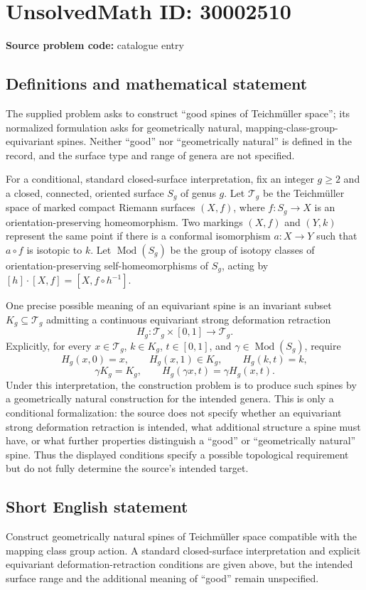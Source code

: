 \documentclass[11pt]{article}
\begin{document}
\section*{UnsolvedMath ID: 30002510}
\textbf{Source problem code:} catalogue entry
\subsection{Definitions and mathematical statement}
The supplied problem asks to construct ``good spines of Teichmüller space''; its normalized formulation asks for geometrically natural, mapping-class-group-equivariant spines. Neither ``good'' nor ``geometrically natural'' is defined in the record, and the surface type and range of genera are not specified.

For a conditional, standard closed-surface interpretation, fix an integer \(g\geq 2\) and a closed, connected, oriented surface \(S_g\) of genus \(g\). Let \(\mathcal T_g\) be the Teichmüller space of marked compact Riemann surfaces \((X,f)\), where \(f:S_g\to X\) is an orientation-preserving homeomorphism. Two markings \((X,f)\) and \((Y,k)\) represent the same point if there is a conformal isomorphism \(a:X\to Y\) such that \(a\circ f\) is isotopic to \(k\). Let \(\operatorname{Mod}(S_g)\) be the group of isotopy classes of orientation-preserving self-homeomorphisms of \(S_g\), acting by \([h]\cdot[X,f]=[X,f\circ h^{-1}]\).

One precise possible meaning of an equivariant spine is an invariant subset \(K_g\subseteq\mathcal T_g\) admitting a continuous equivariant strong deformation retraction
\[
H_g:\mathcal T_g\times[0,1]\longrightarrow\mathcal T_g.
\]
Explicitly, for every \(x\in\mathcal T_g\), \(k\in K_g\), \(t\in[0,1]\), and \(\gamma\in\operatorname{Mod}(S_g)\), require
\[
H_g(x,0)=x,\qquad H_g(x,1)\in K_g,\qquad H_g(k,t)=k,
\]
\[
\gamma K_g=K_g,\qquad H_g(\gamma x,t)=\gamma H_g(x,t).
\]
Under this interpretation, the construction problem is to produce such spines by a geometrically natural construction for the intended genera. This is only a conditional formalization: the source does not specify whether an equivariant strong deformation retraction is intended, what additional structure a spine must have, or what further properties distinguish a ``good'' or ``geometrically natural'' spine. Thus the displayed conditions specify a possible topological requirement but do not fully determine the source's intended target.
\subsection{Short English statement}
Construct geometrically natural spines of Teichmüller space compatible with the mapping class group action. A standard closed-surface interpretation and explicit equivariant deformation-retraction conditions are given above, but the intended surface range and the additional meaning of ``good'' remain unspecified.
\end{document}
